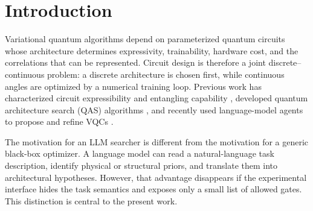 \documentclass[11pt]{article}
\begin{document}
\begin{abstract}
The accepted redesigns were predominantly global --- a median of 11 of 16 gate slots changed --- indicating coordinated architectural reasoning rather than local mutation.
We then stress-tested that cell one factor at a time (budget $B \in \{4,8,16\}$, qubits $n \in \{4,6,8\}$, TFIM versus XXZ, and a second pinned model), and this is the study the paper's conclusions rest on.
The two components separate sharply.
The \emph{score-free semantic prior} is robust: LLM-Open $-$ Random keeps its sign in all six varied conditions and grows where search is hardest, reaching $+0.2841$ ($d_z=5.55$, 12/12 seeds) at eight qubits, while Greedy $-$ Random is significant in none.
The \emph{closed-loop advantage does not generalise}: LLM-Closed $-$ LLM-Open survives in only two of the six varied conditions and significantly reverses at six and eight qubits, so the v5 result must be restated as budget- and width-dependent rather than general.
A separate, measurable failure mode is resource-contract compliance, which falls to $65.1\%$ with the weaker model.
These are small noiseless simulations with twelve paired seeds and two pinned models; no quantum-advantage claim and no general LLM-superiority claim is made.
The main conclusion is conditional: language-model reasoning becomes useful when the task exposes semantic structure that can be converted into circuit priors, rather than merely asking the model to sample gate syntax --- and it is the semantic prior, not the agent's feedback loop, that carries the effect.
\end{abstract}

\section{Introduction}

Variational quantum algorithms depend on parameterized quantum circuits whose architecture determines expressivity, trainability, hardware cost, and the correlations that can be represented.
Circuit design is therefore a joint discrete--continuous problem: a discrete architecture is chosen first, while continuous angles are optimized by a numerical training loop.
Previous work has characterized circuit expressibility and entangling capability \cite{sim2019}, developed quantum architecture search (QAS) algorithms \cite{du2022}, and recently used language-model agents to propose and refine VQCs \cite{knipfer2026}.

The motivation for an LLM searcher is different from the motivation for a generic black-box optimizer.
A language model can read a natural-language task description, identify physical or structural priors, and translate them into architectural hypotheses.
However, that advantage disappears if the experimental interface hides the task semantics and exposes only a small list of allowed gates.
This distinction is central to the present work.
\end{document}
